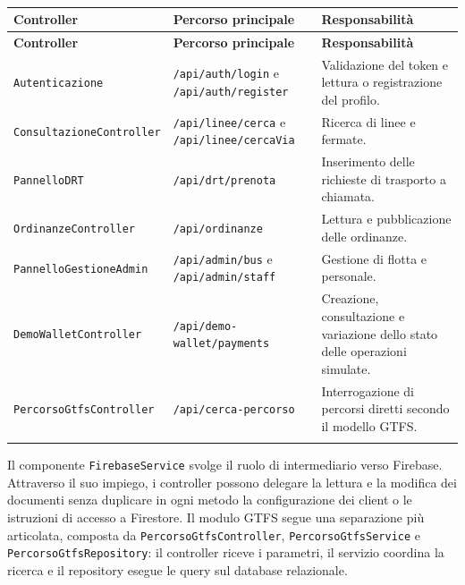 \begin{longtable}{P{4.0cm}P{5.3cm}P{5.0cm}}
\label{tab:api}\\
\toprule
\textbf{Controller} & \textbf{Percorso principale} & \textbf{Responsabilità}\\
\midrule
\endfirsthead

\toprule
\textbf{Controller} & \textbf{Percorso principale} & \textbf{Responsabilità}\\
\midrule
\endhead

\texttt{Autenticazione} &
\texttt{/api/auth/login} e \texttt{/api/auth/register} &
Validazione del token e lettura o registrazione del profilo.\\

\texttt{Consultazione}\newline\texttt{Controller} &
\texttt{/api/linee/cerca} e \texttt{/api/linee/}\newline\texttt{cercaVia} &
Ricerca di linee e fermate.\\

\texttt{PannelloDRT} &
\texttt{/api/drt/prenota} &
Inserimento delle richieste di trasporto a chiamata.\\

\texttt{OrdinanzeController} &
\texttt{/api/ordinanze} &
Lettura e pubblicazione delle ordinanze.\\

\texttt{PannelloGestione}\newline\texttt{Admin} &
\texttt{/api/admin/bus} e \texttt{/api/admin/staff} &
Gestione di flotta e personale.\\

\texttt{DemoWallet}\newline\texttt{Controller} &
\texttt{/api/demo-wallet/}\newline\texttt{payments} &
Creazione, consultazione e variazione dello stato delle operazioni simulate.\\

\texttt{PercorsoGtfs}\newline\texttt{Controller} &
\texttt{/api/cerca-}\newline\texttt{percorso} &
Interrogazione di percorsi diretti secondo il modello GTFS.\\

\bottomrule
\caption{}
\end{longtable}
\noindent
Il componente \texttt{FirebaseService} svolge il ruolo di intermediario verso Firebase. Attraverso il suo impiego, i controller possono delegare la lettura e la modifica dei documenti senza duplicare in ogni metodo la configurazione dei client o le istruzioni di accesso a Firestore. Il modulo GTFS segue una separazione più articolata, composta da \texttt{PercorsoGtfsController}, \texttt{PercorsoGtfsService} e \texttt{PercorsoGtfsRepository}: il controller riceve i parametri, il servizio coordina la ricerca e il repository esegue le query sul database relazionale.
